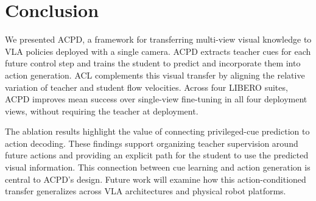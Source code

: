 \documentclass{ELSP}
\begin{document}
\FloatBarrier
\section{Conclusion}
We presented ACPD, a framework for transferring multi-view visual
knowledge to VLA policies deployed with a single camera.
ACPD extracts teacher cues for each future control step and trains
the student to predict and incorporate them into action generation.
ACL complements this visual transfer by aligning the relative
variation of teacher and student flow velocities.
Across four LIBERO suites, ACPD improves mean success over
single-view fine-tuning in all four deployment views, without
requiring the teacher at deployment.

The ablation results highlight the value of connecting
privileged-cue prediction to action decoding.
These findings support organizing teacher supervision around
future actions and providing an explicit path for the student
to use the predicted visual information.
This connection between cue learning and action generation
is central to ACPD's design.
Future work will examine how this action-conditioned transfer
generalizes across VLA architectures and physical robot platforms.
\end{document}
